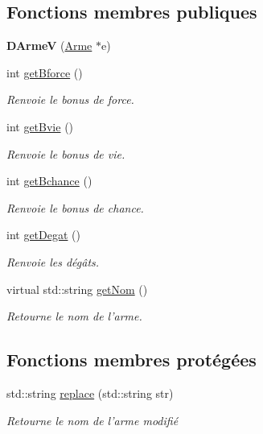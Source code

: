 \subsection*{Fonctions membres publiques}
\begin{DoxyCompactItemize}
\item 
\hypertarget{class_d_arme_v_a09195364c85ee0d457ee6d355ad179ff}{{\bfseries D\-Arme\-V} (\hyperlink{class_arme}{Arme} $\ast$e)}\label{class_d_arme_v_a09195364c85ee0d457ee6d355ad179ff}

\item 
int \hyperlink{class_d_arme_a76075bcbe61b20bd0e21e2d06fe33ab7}{get\-Bforce} ()
\begin{DoxyCompactList}\small\item\em Renvoie le bonus de force. \end{DoxyCompactList}\item 
int \hyperlink{class_d_arme_a91b3a3100969a568a8408ba098668398}{get\-Bvie} ()
\begin{DoxyCompactList}\small\item\em Renvoie le bonus de vie. \end{DoxyCompactList}\item 
int \hyperlink{class_d_arme_ad50d376b08d62276b7cf50d2cd59d619}{get\-Bchance} ()
\begin{DoxyCompactList}\small\item\em Renvoie le bonus de chance. \end{DoxyCompactList}\item 
int \hyperlink{class_d_arme_a7396e865674067f4f21a28e6babc0fad}{get\-Degat} ()
\begin{DoxyCompactList}\small\item\em Renvoie les dégâts. \end{DoxyCompactList}\item 
virtual std\-::string \hyperlink{class_arme_ab1b18cfa41fac19fccedf2165b9ff33c}{get\-Nom} ()
\begin{DoxyCompactList}\small\item\em Retourne le nom de l'arme. \end{DoxyCompactList}\end{DoxyCompactItemize}
\subsection*{Fonctions membres protégées}
\begin{DoxyCompactItemize}
\item 
std\-::string \hyperlink{class_d_arme_a604caa7ee656dab58d15b7cf86863e3d}{replace} (std\-::string str)
\begin{DoxyCompactList}\small\item\em Retourne le nom de l'arme modifié \end{DoxyCompactList}\end{DoxyCompactItemize}
